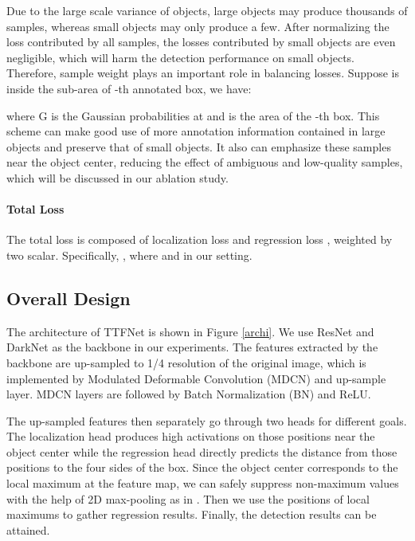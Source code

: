 \documentclass[letterpaper]{article} \usepackage{aaai20}  \usepackage{times}  \usepackage{helvet} \usepackage{courier}  \usepackage[hyphens]{url}  \usepackage{graphicx} \urlstyle{rm} \def\UrlFont{\rm}  \usepackage{graphicx}  \frenchspacing  \setlength{\pdfpagewidth}{8.5in}  \setlength{\pdfpageheight}{11in}  \usepackage{subcaption}
\begin{document}
Due to the large scale variance of objects, large objects may produce thousands of samples, whereas small objects may only produce a few. After normalizing the loss contributed by all samples, the losses contributed by small objects are even negligible, which will harm the detection performance on small objects. Therefore, sample weight  plays an important role in balancing losses. Suppose  is inside the sub-area  of -th annotated box, we have:



\noindent where G is the Gaussian probabilities at  and  is the area of the -th box. This scheme can make good use of more annotation information contained in large objects and preserve that of small objects. It also can emphasize these samples near the object center, reducing the effect of ambiguous and low-quality samples, which will be discussed in our ablation study.


\paragraph{Total Loss}

The total loss  is composed of localization loss  and regression loss , weighted by two scalar. Specifically, , where  and  in our setting.


\subsection{Overall Design}

The architecture of TTFNet is shown in Figure \ref{archi}. We use ResNet and DarkNet \cite{redmon2018yolov3} as the backbone in our experiments. The features extracted by the backbone are up-sampled to 1/4 resolution of the original image, which is implemented by Modulated Deformable Convolution (MDCN) \cite{zhu2019deformable} and up-sample layer. MDCN layers are followed by Batch Normalization (BN) \cite{DBLP:conf/icml/IoffeS15} and ReLU. 

The up-sampled features then separately go through two heads for different goals. The localization head produces high activations on those positions near the object center while the regression head directly predicts the distance from those positions to the four sides of the box. Since the object center corresponds to the local maximum at the feature map, we can safely suppress non-maximum values with the help of 2D max-pooling as in \cite{law2018cornernet,DBLP:journals/corr/abs-1904-07850}. Then we use the positions of local maximums to gather regression results. Finally, the detection results can be attained.
\end{document}

